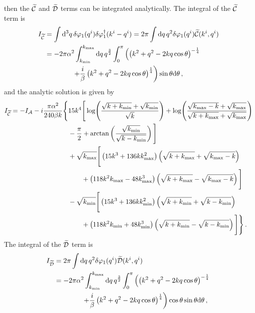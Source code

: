 % 
then the $\widetilde{\mathcal{C}}$ and $\widetilde{\mathcal{D}}$ terms can be integrated analytically.
The integral of the $\widetilde{\mathcal{C}}$ term is 
% 
\begin{align}
 \label{eq:cint-num}
I_{\wt{\C}} &= \int\d^3 q\, \dvp1(\qvi) \dN{\dvp1}(\kvi-\qvi) 
    = 2\pi \int \d q\, q^2 \dvp1(\qvi) \wt{\C}(\kvi, \qvi) \nonumber\\
% 
 &= -2\pi\alpha^2 \int_{\kmin}^{\kmax} \d q\, q^{\frac{3}{2}} \int_0^\pi 
     \left( \left(k^2 + q^2 -2kq \cos\theta\right)^{-\frac{1}{4}} \right.\nonumber \\
            &\qquad \qquad \left.+\frac{i}{\beta}\left(k^2 + q^2 -2kq
\cos\theta\right)^{\frac{1}{4}}
	\right) \sin\theta \d \theta\,,
\end{align}
% 
and the analytic solution is given by
% 
\begin{align}
\label{eq:cint-soln-num}
I_{\wt{\C}} = -I_\A -i\frac{\pi\alpha^2}{240 \beta k}\Bigg\{ 
	&15 k^4 \Bigg[ \log\Biggl(\frac{\sqrt{k+\kmin} + \sqrt{\kmin}}{\sqrt{k}}
			    \Biggr)
	 + \log\Biggl( \frac{\sqrt{\kmax-k} + \sqrt{\kmax}}{\sqrt{k+\kmax}
			+\sqrt{\kmax}}\Biggr) \nonumber \\
	&-\frac{\pi}{2} + \arctan\left( \frac{\sqrt{\kmin}}{\sqrt{k-\kmin}}\right)
	\Bigg] \nonumber\\
% 
        &+\sqrt{\kmax}\Bigg[ \left(15k^3 + 136k\kmax^2 \right)\left(\sqrt{k+\kmax} +
	  \sqrt{\kmax-k}\right) \nonumber \\
	&\qquad +\left(118k^2\kmax -48\kmax^3\right) \left(\sqrt{k+\kmax} -
         \sqrt{\kmax -k} \right) \Bigg] \nonumber \\
% 
	&-\sqrt{\kmin}\Bigg[ \left(15k^3 + 136k\kmin^2 \right)\left(\sqrt{k+\kmin} +
	  \sqrt{k-\kmin}\right) \nonumber \\
	&\qquad +\left(118k^2\kmin +48\kmin^3\right) \left(\sqrt{k+\kmin} -
         \sqrt{k-\kmin} \right) \Bigg] \Bigg\} \,.
\end{align}
The integral of the $\widetilde{\mathcal{D}}$ term is 
% 
\begin{align}
 \label{eq:dint-num}
I_{\wt{\D}} &= 2\pi \int \d q\, q^2 \dvp1(\qvi) \wt{\D}(\kvi, \qvi) \\
% 
 &= -2\pi\alpha^2 \int_{\kmin}^{\kmax} \d q\, q^{\frac{3}{2}} \int_0^\pi 
     \left( \left(k^2 + q^2 -2kq \cos\theta\right)^{-\frac{1}{4}} \right.\nonumber\\
% 
        &\qquad\qquad\left.+\frac{i}{\beta}\left(k^2 + q^2 -2kq
\cos\theta\right)^{\frac{1}{4}}
	\right) \cos\theta\sin\theta \d \theta\,,
\end{align}
% 
